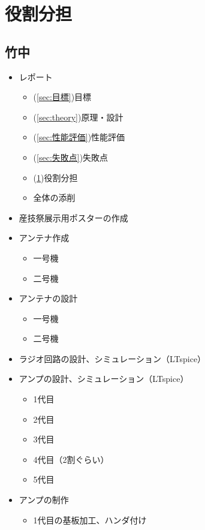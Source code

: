 \documentclass[report.tex]{subfiles}
\begin{document}
\section{役割分担} \label{sec:役割分担}

\subsection{竹中}

\begin{itemize}
	\item レポート
	      \begin{itemize}
		      \item (\ref{sec:目標})目標
		      \item (\ref{sec:theory})原理・設計
		      \item (\ref{sec:性能評価})性能評価
		      \item (\ref{sec:失敗点})失敗点
		      \item (\ref{sec:役割分担})役割分担
		      \item 全体の添削
	      \end{itemize}
	\item 産技祭展示用ポスターの作成
	\item アンテナ作成
	      \begin{itemize}
		      \item 一号機
		      \item 二号機
	      \end{itemize}
	\item アンテナの設計
	      \begin{itemize}
		      \item 一号機
		      \item 二号機
	      \end{itemize}
	\item ラジオ回路の設計、シミュレーション（LTspice）
	\item アンプの設計、シミュレーション（LTspice）
	      \begin{itemize}
		      \item 1代目
		      \item 2代目
		      \item 3代目
		      \item 4代目（2割ぐらい）
		      \item 5代目
	      \end{itemize}
	\item アンプの制作
	      \begin{itemize}
		      \item 1代目の基板加工、ハンダ付け

\end{itemize}
\end{itemize}
\end{document}

